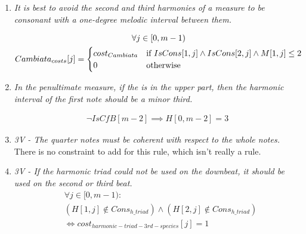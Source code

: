 \begin{enumerate}[wide, label=\bfseries 3.H\arabic*]
\item\label{rule:cambiata} {\textit{It is best to avoid the second and third harmonies of a measure to be consonant with a one-degree melodic interval between them.}}


\begin{equation}
    \begin{gathered}
        \forall j \in [0, m-1)\\
        Cambiata_{costs}[j] = \begin{cases}
            cost_{Cambiata} & \text{if } IsCons[1, j] \land IsCons[2, j] \land M[1, j] \leq 2\\
            0 & \text{otherwise}
        \end{cases}
    \end{gathered}
\end{equation}

\item\label{rule:penult3sp} {\textit{In the penultimate measure, if the \cfs is in the upper part, then the harmonic interval of the first note should be a minor third.}}

\begin{equation}
    \begin{gathered}
        \lnot IsCfB[m-2] \implies H[0, m-2] = 3
    \end{gathered}
\end{equation}

\item \textit{3V - The quarter notes must be coherent with respect to the whole notes.}
There is no constraint to add for this rule, which isn't really a rule.

\item \textit{3V - If the harmonic triad could not be used on the downbeat, it should be used on the second or third beat.}    
    \begin{equation} \begin{aligned}
            &\forall j \in [0, m-1) \colon \\
            &(H[1, j] \notin Cons_{h\_triad}) \land  (H[2, j] \notin Cons_{h\_triad})\\
            &\iff cost_{harmonic-triad-3rd-species}[j] = 1       
    \end{aligned} \end{equation}
\end{enumerate}


